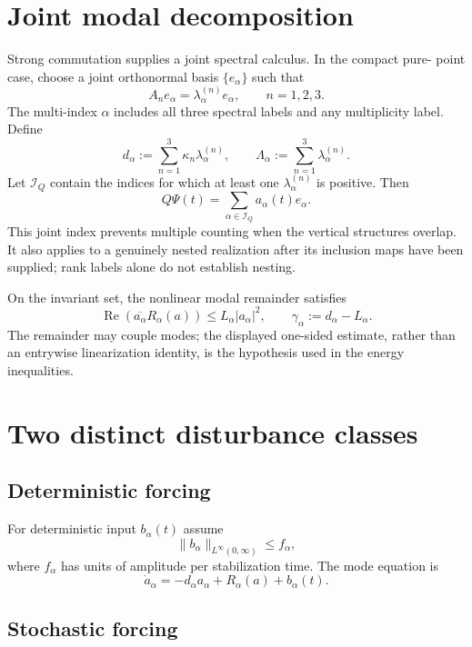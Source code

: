 \documentclass[11pt]{article}
\begin{document}
\section{Joint modal decomposition}

Strong commutation supplies a joint spectral calculus. In the compact pure-
point case, choose a joint orthonormal basis $\{e_\alpha\}$ such that
\[
A_ne_\alpha=\lambda_\alpha^{(n)}e_\alpha,
\qquad n=1,2,3.
\]
The multi-index $\alpha$ includes all three spectral labels and any
multiplicity label. Define
\[
d_\alpha:=\sum_{n=1}^3\kappa_n\lambda_\alpha^{(n)},
\qquad
\Lambda_\alpha:=\sum_{n=1}^3\lambda_\alpha^{(n)}.
\]
Let $\mathcal I_Q$ contain the indices for which at least one
$\lambda_\alpha^{(n)}$ is positive. Then
\[
Q\Psi(t)=\sum_{\alpha\in\mathcal I_Q}a_\alpha(t)e_\alpha.
\]
This joint index prevents multiple counting when the vertical structures
overlap. It also applies to a genuinely nested realization after its inclusion
maps have been supplied; rank labels alone do not establish nesting.

\begin{assumption}\label{ass:one-sided}
On the invariant set, the nonlinear modal remainder satisfies
\[
\operatorname{Re}(\overline{a_\alpha}R_\alpha(a))
\le L_\alpha|a_\alpha|^2,
\qquad
\gamma_\alpha:=d_\alpha-L_\alpha.
\]
The remainder may couple modes; the displayed one-sided estimate, rather than
an entrywise linearization identity, is the hypothesis used in the energy
inequalities.
\end{assumption}

\section{Two distinct disturbance classes}

\subsection{Deterministic forcing}

For deterministic input $b_\alpha(t)$ assume
\[
\|b_\alpha\|_{L^\infty(0,\infty)}\le f_\alpha,
\]
where $f_\alpha$ has units of amplitude per stabilization time. The mode
equation is
\begin{equation}
\dot a_\alpha=-d_\alpha a_\alpha+R_\alpha(a)+b_\alpha(t).
\label{eq:det-mode}
\end{equation}

\subsection{Stochastic forcing}
\end{document}
